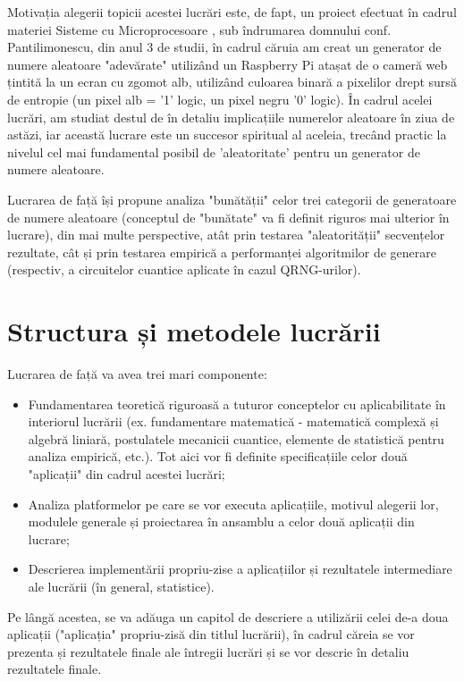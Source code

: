 Motivația alegerii topicii acestei lucrări este, de fapt, un proiect efectuat în cadrul materiei Sisteme cu Microprocesoare \cite{misc:web:proiectSM}, sub îndrumarea domnului conf. Pantilimonescu, din anul 3 de studii, în cadrul căruia am creat un generator de numere aleatoare "adevărate" utilizând un Raspberry Pi atașat de o cameră web țintită la un ecran cu zgomot alb, utilizând culoarea binară a pixelilor drept sursă de entropie (un pixel alb = '1' logic, un pixel negru '0' logic). În cadrul acelei lucrări, am studiat destul de în detaliu implicațiile numerelor aleatoare în ziua de astăzi, iar această lucrare este un succesor spiritual al aceleia, trecând practic la nivelul cel mai fundamental posibil de 'aleatoritate' pentru un generator de numere aleatoare.

Lucrarea de față își propune analiza "bunătății" celor trei categorii de generatoare de numere aleatoare (conceptul de "bunătate" va fi definit riguros mai ulterior în lucrare), din mai multe perspective, atât prin testarea "aleatorității" secvențelor rezultate, cât și prin testarea empirică a performanței algoritmilor de generare (respectiv, a circuitelor cuantice aplicate în cazul QRNG-urilor). 

\pagebreak

\section{Structura și metodele lucrării}
Lucrarea de față va avea trei mari componente:
\begin{itemize}
    \item Fundamentarea teoretică riguroasă a tuturor conceptelor cu aplicabilitate în interiorul lucrării (ex. fundamentare matematică - matematică complexă și algebră liniară, postulatele mecanicii cuantice, elemente de statistică pentru analiza empirică, etc.). Tot aici vor fi definite specificațiile celor două "aplicații" din cadrul acestei lucrări;
    \item Analiza platformelor pe care se vor executa aplicațiile, motivul alegerii lor, modulele generale și proiectarea în ansamblu a celor două aplicații din lucrare;
    \item Descrierea implementării propriu-zise a aplicațiilor și rezultatele intermediare ale lucrării (în general, statistice).
\end{itemize}

Pe lângă acestea, se va adăuga un capitol de descriere a utilizării celei de-a doua aplicații ("aplicația" propriu-zisă din titlul lucrării), în cadrul căreia se vor prezenta și rezultatele finale ale întregii lucrări și se vor descrie în detaliu rezultatele finale.


